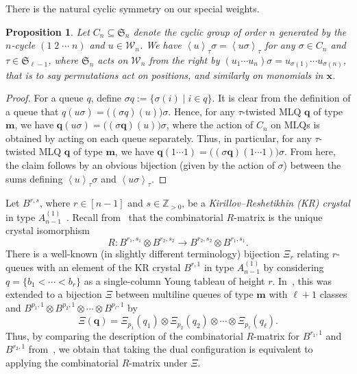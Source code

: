 \documentclass[reqno]{amsart}
\newcommand{\0}{\phantom{c}}
\newcommand{\swt}[1]{\left\langle #1 \right\rangle} %
\newcommand{\SymGp}[1]{\mathfrak{S}_{#1}} %
\newcommand{\xx}{\mathbf{x}}
\newcommand{\mm}{\mathbf{m}}
\newcommand{\qq}{\mathbf{q}}
\newcommand{\mcW}{\mathcal{W}}
\newcommand{\ZZ}{\mathbb{Z}}
\newcommand{\defn}[1]{{\color{darkred}\emph{#1}}} %
\theoremstyle{plain}
\newtheorem{prop}[thm]{Proposition}
\theoremstyle{definition}
\numberwithin{equation}{section}
\begin{document}
There is the natural cyclic symmetry on our special weights.

\begin{prop}
  Let $C_n \subseteq \SymGp{n}$ denote the cyclic group of order $n$ generated by the $n$-cycle $(1 \; 2 \; \dotsm \; n)$ and $u \in \mcW_n$.
  We have $\swt{u}_{\tau}\sigma = \swt{u \sigma}_{\tau}$ for any $\sigma \in C_n$ and $\tau \in \SymGp{\ell-1}$, where $\SymGp{n}$ acts on $\mcW_n$ from the right by $(u_1 \dotsm u_n) \sigma = u_{\sigma(1)} \dotsm u_{\sigma(n)}$, that is to say permutations act on positions, and similarly on monomials in $\xx$.
\end{prop}

\begin{proof}
  For a queue $q$, define $\sigma q := \{ \sigma(i) \mid i \in q\}$.
  It is clear from the definition of a queue that $q(u \sigma) = \bigl( (\sigma q)(u) \bigr) \sigma$.
  Hence, for any $\tau$-twisted MLQ $\qq$ of type $\mm$, we have
  $\qq (u \sigma) = \bigl( (\sigma \qq)(u) \bigr) \sigma$,
  where the action of $C_n$ on MLQs is obtained by acting on each queue separately.
  Thus, in particular, for any $\tau$-twisted MLQ $\qq$ of type $\mm$, we have
  $\qq (1 \cdots 1) = \bigl( (\sigma \qq)(1 \cdots 1) \bigr) \sigma$.
  From here, the claim follows by an obvious bijection
  (given by the action of $\sigma$) between the sums defining
  $\swt{u}_{\tau} \sigma$ and $\swt{u \sigma}_{\tau}$.
\end{proof}

Let $B^{r,s}$, where $r \in [n-1]$ and $s \in \ZZ_{>0}$, be a \defn{Kirillov--Reshetikhin (KR) crystal} in type $A_{n-1}^{(1)}$~\cite{KKMMNN92}.
Recall from~\cite{NY97,Shimozono02} that the combinatorial $R$-matrix is the unique crystal isomorphism
\[
R \colon B^{r_1,s_1} \otimes B^{r_2,s_2} \to B^{r_2,s_2} \otimes B^{r_1,s_1}.
\]
There is a well-known (in slightly different terminology) bijection $\Xi_r$ relating $r$-queues with an element of the KR crystal $B^{r,1}$ in type $A_{n-1}^{(1)}$ by considering $q = \{b_1 < \cdots < b_r\}$  as a single-column Young tableau of height $r$.
In~\cite{KMO15}, this was extended to a bijection $\Xi$ between multiline queues of type $\mm$ with $\ell+1$ classes and $B^{p_1,1} \otimes B^{p_2,1} \otimes \dotsm \otimes B^{p_{\ell},1}$ by
\[
\Xi(\qq) = \Xi_{p_1}(q_1) \otimes \Xi_{p_2}(q_2) \otimes \dotsm \otimes \Xi_{p_{\ell}}(q_{\ell}).
\]
Thus, by comparing the description of the combinatorial $R$-matrix for $B^{r_1,1}$ and $B^{r_2,1}$ from~\cite{NY97}, we obtain that taking the dual configuration is equivalent to applying the combinatorial $R$-matrix under $\Xi$.
\end{document}
